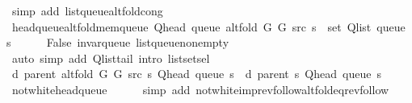 \begin{isabellebody}
\ {\isacharparenleft}{\kern0pt}simp\ add{\isacharcolon}{\kern0pt}\ list{\isacharunderscore}{\kern0pt}queue{\isacharunderscore}{\kern0pt}alt{\isacharunderscore}{\kern0pt}fold{\isacharunderscore}{\kern0pt}cong{\isacharparenright}{\kern0pt}\isanewline
\ \ \isamarkupfalse%
\ head{\isacharunderscore}{\kern0pt}queue{\isacharunderscore}{\kern0pt}alt{\isacharunderscore}{\kern0pt}fold{\isacharunderscore}{\kern0pt}mem{\isacharunderscore}{\kern0pt}queue{\isacharcolon}{\kern0pt}\ {\isachardoublequoteopen}Q{\isacharunderscore}{\kern0pt}head\ {\isacharparenleft}{\kern0pt}queue\ {\isacharparenleft}{\kern0pt}alt{\isacharunderscore}{\kern0pt}fold\ G{}\ G{}\ src\ s{\isacharparenright}{\kern0pt}{\isacharparenright}{\kern0pt}\ {\isasymin}\ set\ {\isacharparenleft}{\kern0pt}Q{\isacharunderscore}{\kern0pt}list\ {\isacharparenleft}{\kern0pt}queue\ s{\isacharparenright}{\kern0pt}{\isacharparenright}{\kern0pt}{\isachardoublequoteclose}\isanewline
\ \ \ \ \isamarkupfalse%
\ False\ invar{\isacharunderscore}{\kern0pt}queue\ list{\isacharunderscore}{\kern0pt}queue{\isacharunderscore}{\kern0pt}non{\isacharunderscore}{\kern0pt}empty\isanewline
\ \ \ \ \isamarkupfalse%
\ {\isacharparenleft}{\kern0pt}auto\ simp\ add{\isacharcolon}{\kern0pt}\ Q{\isachardot}{\kern0pt}list{\isacharunderscore}{\kern0pt}tail\ intro{\isacharcolon}{\kern0pt}\ list{\isachardot}{\kern0pt}set{\isacharunderscore}{\kern0pt}sel{\isacharparenleft}{\kern0pt}{}{\isacharparenright}{\kern0pt}{\isacharparenright}{\kern0pt}\isanewline
\isanewline
\ \ \isamarkupfalse%
\ {\isachardoublequoteopen}d\ {\isacharparenleft}{\kern0pt}parent\ {\isacharparenleft}{\kern0pt}alt{\isacharunderscore}{\kern0pt}fold\ G{}\ G{}\ src\ s{\isacharparenright}{\kern0pt}{\isacharparenright}{\kern0pt}\ {\isacharparenleft}{\kern0pt}Q{\isacharunderscore}{\kern0pt}head\ {\isacharparenleft}{\kern0pt}queue\ s{\isacharparenright}{\kern0pt}{\isacharparenright}{\kern0pt}\ {\isacharequal}{\kern0pt}\ d\ {\isacharparenleft}{\kern0pt}parent\ s{\isacharparenright}{\kern0pt}\ {\isacharparenleft}{\kern0pt}Q{\isacharunderscore}{\kern0pt}head\ {\isacharparenleft}{\kern0pt}queue\ s{\isacharparenright}{\kern0pt}{\isacharparenright}{\kern0pt}{\isachardoublequoteclose}\isanewline
\ \ \ \ \isamarkupfalse%
\ not{\isacharunderscore}{\kern0pt}white{\isacharunderscore}{\kern0pt}head{\isacharunderscore}{\kern0pt}queue\isanewline
\ \ \ \ \isamarkupfalse%
\ {\isacharparenleft}{\kern0pt}simp\ add{\isacharcolon}{\kern0pt}\ not{\isacharunderscore}{\kern0pt}white{\isacharunderscore}{\kern0pt}imp{\isacharunderscore}{\kern0pt}rev{\isacharunderscore}{\kern0pt}follow{\isacharunderscore}{\kern0pt}alt{\isacharunderscore}{\kern0pt}fold{\isacharunderscore}{\kern0pt}eq{\isacharunderscore}{\kern0pt}rev{\isacharunderscore}{\kern0pt}follow{\isacharparenright}{\kern0pt}\isanewline

\end{isabellebody}
